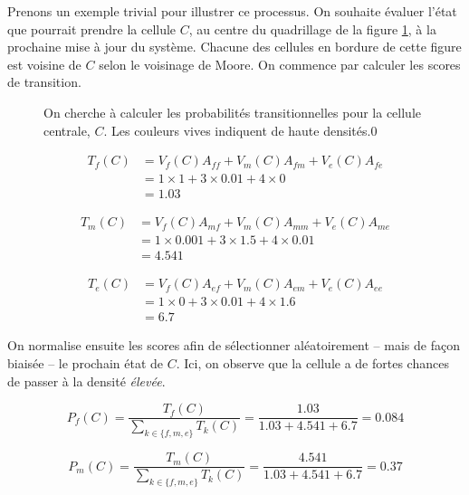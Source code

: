 \documentclass[10pt]{article}
\begin{document}
Prenons un exemple trivial pour illustrer ce processus. On souhaite
évaluer l'état que pourrait prendre la cellule $C$, au centre du
quadrillage de la figure \ref{fig:ca-example}, à la prochaine mise à
jour du système. Chacune des cellules en bordure de cette figure est
voisine de $C$ selon le voisinage de Moore. On commence par calculer
les scores de transition.

\begin{figure}[!ht]
  \centering
  
  \caption{On cherche à calculer les probabilités transitionnelles
    pour la cellule centrale, $C$. Les couleurs vives indiquent de
    haute densités.0}
  \label{fig:ca-example}
\end{figure}

\begin{align*}
T_f(C) &= V_f(C) A_{ff} + V_m(C) A_{fm} + V_e(C) A_{fe} \\
       &= 1 \times 1 + 3 \times 0.01 + 4 \times 0 \\
       &= 1.03
\end{align*}

\begin{align*}
T_m(C) &= V_f(C) A_{mf} + V_m(C) A_{mm} + V_e(C) A_{me} \\
       &= 1 \times 0.001 + 3 \times 1.5 + 4 \times 0.01 \\
       &= 4.541
\end{align*}

\begin{align*}
T_e(C) &= V_f(C) A_{ef} + V_m(C) A_{em} + V_e(C) A_{ee} \\
       &= 1 \times 0 + 3 \times 0.01 + 4 \times 1.6 \\
       &= 6.7
\end{align*}

On normalise ensuite les scores afin de sélectionner aléatoirement --
mais de façon biaisée -- le prochain état de $C$. Ici, on observe que
la cellule a de fortes chances de passer à la densité \textit{élevée}.

\begin{equation*}
P_f(C) = \frac{T_f(C)}{\sum_{k \in \{f,m,e\}} T_k(C)} = \frac{1.03}{1.03 + 4.541 + 6.7} = 0.084
\end{equation*}

\begin{equation*}
P_m(C) = \frac{T_m(C)}{\sum_{k \in \{f,m,e\}} T_k(C)} = \frac{4.541}{1.03 + 4.541 + 6.7} = 0.37
\end{equation*}
\end{document}
